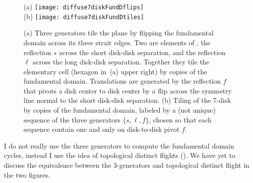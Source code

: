 

\begin{figure}[htbp]
  \begin{center}
    (a) \texttt{[image: diffuse7diskFundDflips]}
    \\
    (b) \texttt{[image: diffuse7diskFundDtiles]}
  \end{center}
  \caption{\label{fig-7diskFundDflips}
  (a) Three generators tile the plane by flipping the fundamental domain
  across its three strait edges. Two are elements of , the
  reflection  $s$ across the short disk-disk separation, and the
  reflection $\ell$ across the long disk-disk separation. Together they
  tile the elementary cell (hexagon in \,(a)
  upper right) by copies of the fundamental domain. Translations are
  generated by the reflection $f$ that pivots a  disk center to disk
  center by a flip across the symmetry line normal to the short disk-disk
  separation.
  (b) Tiling of the 7-disk by copies of the fundamental domain, labeled
  by a (not unique) sequence of the three generators  $\{s,\ell,f\}$,
  chosen so that each sequence contain one and only on  disk-to-disk
  pivot $f$.
  }
\end{figure}
    {I do not really use the three generators to compute the fundamental
    domain cycles, instead I use the idea of topological distinct flights
    (). We have yet to discuss the equivalence
    between the 3-generators and topological distinct flight in the two
    figures.
    }


